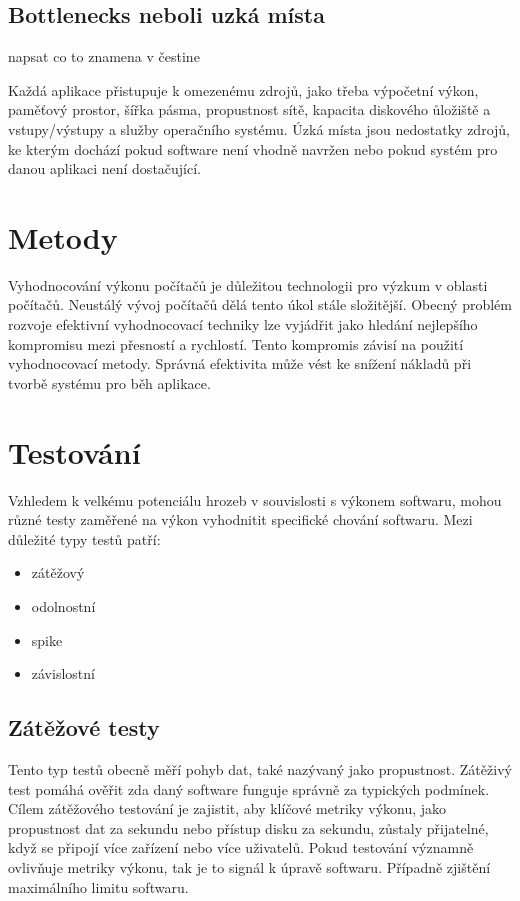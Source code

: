 \subsection*{Bottlenecks neboli uzká místa} napsat co to znamena v čestine

Každá aplikace přistupuje k omezenému zdrojů, jako třeba výpočetní výkon, paměťový prostor, šířka pásma, propustnost sítě, kapacita diskového ůložiště a vstupy/výstupy
a služby operačního systému. Úzká místa jsou nedostatky zdrojů, ke kterým dochází pokud software není vhodně navržen nebo pokud systém pro danou aplikaci není dostačující.

\iffalse
https://searchsoftwarequality.techtarget.com/answer/Required-prerequisites-for-performance-testing
\fi

\section{Metody}

Vyhodnocování výkonu počítačů je důležitou technologii pro výzkum v oblasti počítačů. Neustálý vývoj počítačů dělá tento úkol stále složitější.
Obecný problém rozvoje efektivní vyhodnocovací techniky lze vyjádřit jako hledání nejlepšího kompromisu mezi přesností a rychlostí. Tento kompromis závisí na
použití vyhodnocovací metody. Správná efektivita může vést ke snížení nákladů při tvorbě systému pro běh aplikace.

\section{Testování}

Vzhledem k velkému potenciálu hrozeb v souvislosti s výkonem softwaru, mohou různé testy zaměřené na výkon vyhodnitit specifické chování softwaru. Mezi důležité typy testů patří:
\begin{itemize}
    \item{zátěžový}
    \item{odolnostní}
    \item{spike}
    \item{závislostní}
\end{itemize}

\subsection*{Zátěžové testy}

Tento typ testů obecně měří pohyb dat, také nazývaný jako propustnost. Zátěživý test pomáhá ověřit zda daný software funguje správně za typických podmínek. Cílem zátěžového testování je zajistit,
aby klíčové metriky výkonu, jako propustnost dat za sekundu nebo přístup disku za sekundu, zůstaly přijatelné, když se připojí více zařízení nebo více uživatelů. Pokud testování významně
ovlivňuje metriky výkonu, tak je to signál k úpravě softwaru. Případně zjištění maximálního limitu softwaru.

